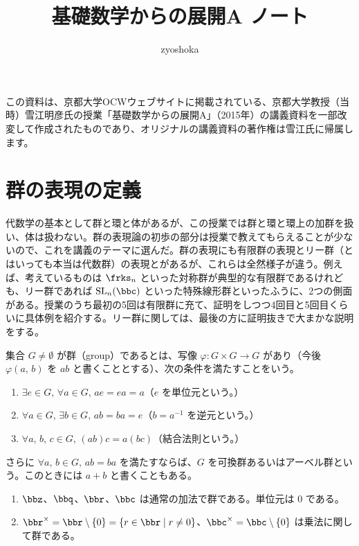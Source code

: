 \documentclass[a4paper]{ltjsarticle}
\begin{document}
\title{基礎数学からの展開A ノート}
\author{zyoshoka}
\maketitle
\thispagestyle{firstpage}

この資料は、京都大学OCWウェブサイトに掲載されている、京都大学教授（当時）雪江明彦氏の授業「基礎数学からの展開A」（2015年）の講義資料を一部改変して作成されたものであり、オリジナルの講義資料の著作権は雪江氏に帰属します。

\section{群の表現の定義}

代数学の基本として群と環と体があるが、この授業では群と環と環上の加群を扱い、体は扱わない。群の表現論の初歩の部分は授業で教えてもらえることが少ないので、これを講義のテーマに選んだ。群の表現にも有限群の表現とリー群（とはいっても本当は代数群）の表現とがあるが、これらは全然様子が違う。例えば、考えているものは $\frks_n$ といった対称群が典型的な有限群であるけれども、リー群であれば $\SL_n(\bbc)$ といった特殊線形群といったふうに、2つの側面がある。授業のうち最初の5回は有限群に充て、証明をしつつ4回目と5回目くらいに具体例を紹介する。リー群に関しては、最後の方に証明抜きで大まかな説明をする。

\begin{dfn}[群]
  集合 $G\neq\emptyset$ が群（group）であるとは、写像 $\varphi\colon G\times G\to G$ があり（今後 $\varphi(a,\,b)$ を $ab$ と書くこととする）、次の条件を満たすことをいう。
  \begin{enumerate}
    \item $\exists e\in G,\,\forall a\in G,\,ae = ea = a$（$e$ を単位元という。）
    \item $\forall a\in G,\,\exists b\in G,\,ab = ba = e$（$b = a^{-1}$ を逆元という。）
    \item $\forall a,\,b,\,c\in G,\,(ab)c = a(bc)$（結合法則という。）
  \end{enumerate}
  さらに $\forall a,\,b\in G,\,ab = ba$ を満たすならば、$G$ を可換群あるいはアーベル群という。このときには $a + b$ と書くこともある。
\end{dfn}

\begin{exm}\leavevmode
  \begin{enumerate}
    \item $\bbz$、$\bbq$、$\bbr$、$\bbc$ は通常の加法で群である。単位元は $0$ である。
    \item $\bbr^\times = \bbr\setminus\{0\} = \{r\in\bbr\mid r\neq 0\}$、$\bbc^\times = \bbc\setminus\{0\}$ は乗法に関して群である。
  \end{enumerate}
\end{exm}
\end{document}
